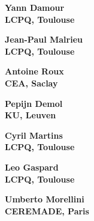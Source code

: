 \documentclass[20pt]{beamer}
\begin{document}
\begin{frame}
	\begin{center}
		\huge \bf Yann Damour
		\\
		\vspace{20mm}
		\large LCPQ, Toulouse
	\end{center}
\end{frame}

\begin{frame}
	\begin{center}
		\huge \bf Jean-Paul Malrieu
		\\
		\vspace{20mm}
		\large LCPQ, Toulouse
	\end{center}
\end{frame}

\begin{frame}
	\begin{center}
		\huge \bf Antoine Roux
		\\
		\vspace{20mm}
		\large CEA, Saclay
	\end{center}
\end{frame}

\begin{frame}
	\begin{center}
		\huge \bf Pepijn Demol
		\\
		\vspace{20mm}
		\large KU, Leuven
	\end{center}
\end{frame}

\begin{frame}
	\begin{center}
		\huge \bf Cyril Martins
		\\
		\vspace{20mm}
		\large LCPQ, Toulouse
	\end{center}
\end{frame}

\begin{frame}
	\begin{center}
		\huge \bf Leo Gaspard
		\\
		\vspace{20mm}
		\large LCPQ, Toulouse
	\end{center}
\end{frame}

\begin{frame}
	\begin{center}
		\huge \bf Umberto Morellini
		\\
		\vspace{20mm}
		\large CEREMADE, Paris
	\end{center}
\end{frame}
\end{document}
